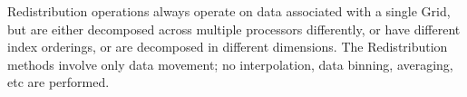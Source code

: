 

Redistribution operations always operate on data associated with a
single Grid, but are either decomposed across multiple processors
differently, or have different index orderings, or are decomposed
in different dimensions.  The Redistribution methods involve only
data movement; no interpolation, data binning, averaging, etc are
performed.


